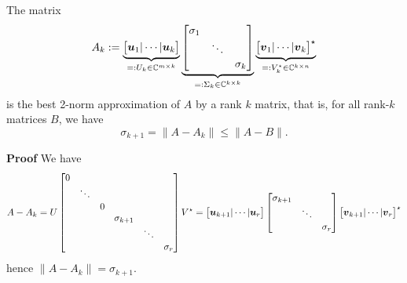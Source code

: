 \begin{theorem} The  matrix
\[
A_k := \underbrace{\begin{bmatrix} \bm{{\mbox{\boldmath$u$\unboldmath}}}_1 | \cdots | \bm{{\mbox{\boldmath$u$\unboldmath}}}_k \end{bmatrix}}_{=: U_k \in {\mathbb C}^{m \times k}} \underbrace{\begin{bmatrix}
\sigma_1 \\
& \ddots \\
&& \sigma_k\end{bmatrix}}_{=: \Sigma_k \in {\mathbb C}^{k \times k}} \underbrace{\begin{bmatrix} \bm{{\mbox{\boldmath$v$\unboldmath}}}_1 | \cdots | \bm{{\mbox{\boldmath$v$\unboldmath}}}_k \end{bmatrix}^\star}_{=: V_k^\star \in {\mathbb C}^{k \times n}}
\]
is the best 2-norm approximation of $A$ by a rank $k$ matrix, that is, for all rank-$k$ matrices $B$, we have 
\[
\ensuremath{\sigma}_{k+1} = \|A - A_k\| \ensuremath{\leq} \|A -B \|.
\]
\end{theorem}
\textbf{Proof} We have
\[
A - A_k = U \begin{bmatrix} 0  \cr &\ddots \cr && 0 \cr &&& \sigma_{k+1} \cr &&&& \ddots \cr &&&&& \sigma_r\end{bmatrix} V^\star
= \begin{bmatrix} \bm{{\mbox{\boldmath$u$\unboldmath}}}_{k+1} | \cdots | \bm{{\mbox{\boldmath$u$\unboldmath}}}_r \end{bmatrix}
\begin{bmatrix}
\sigma_{k+1} \\
& \ddots \\
&& \sigma_r \end{bmatrix}\begin{bmatrix} \bm{{\mbox{\boldmath$v$\unboldmath}}}_{k+1} | \cdots | \bm{{\mbox{\boldmath$v$\unboldmath}}}_r \end{bmatrix}^\star
\]
hence $\| A - A_k \| = \ensuremath{\sigma}_{k+1}$.

